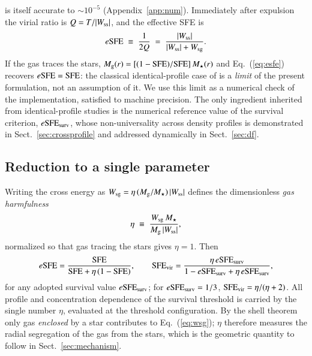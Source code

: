 \documentclass{aa}
\newcommand{\esfe}{e{\rm SFE}}
\newcommand{\sfe}{{\rm SFE}}
\begin{document}
is itself accurate to $\sim10^{-5}$ (Appendix~\ref{app:num}).
Immediately after expulsion the virial ratio is $Q=T/|W_{\rm ss}|$, and
the effective SFE \citep{Goodwin2009} is
\begin{equation}
  \esfe \;\equiv\; \frac{1}{2Q}
        \;=\; \frac{|W_{\rm ss}|}{|W_{\rm ss}|+W_{\rm sg}} .
  \label{eq:esfe}
\end{equation}
If the gas traces the stars, $M_{\rm g}(r)=[(1-\sfe)/\sfe]\,M_\star(r)$
and Eq.~(\ref{eq:esfe}) recovers $\esfe=\sfe$: the classical
identical-profile case of \citet{BoilyKroupa2003a} is a \emph{limit} of
the present formulation, not an assumption of it. We use this limit as a
numerical check of the implementation, satisfied to machine precision.
The only ingredient inherited from identical-profile studies is the
numerical reference value of the survival criterion,
$\esfe_{\rm surv}$, whose non-universality across density profiles is
demonstrated in Sect.~\ref{sec:crossprofile} and addressed dynamically in
Sect.~\ref{sec:df}.

\subsection{Reduction to a single parameter}
\label{sec:eta}

Writing the cross energy as
$W_{\rm sg}=\eta\,(M_{\rm g}/M_\star)\,|W_{\rm ss}|$ defines the
dimensionless \emph{gas harmfulness}
\begin{equation}
  \eta \;\equiv\; \frac{W_{\rm sg}\,M_\star}{M_{\rm g}\,|W_{\rm ss}|},
  \label{eq:eta}
\end{equation}
normalized so that gas tracing the stars gives $\eta=1$. Then
\begin{equation}
  \esfe = \frac{\sfe}{\sfe+\eta\,(1-\sfe)},
  \qquad
  \sfe_{\rm vir}=\frac{\eta\,\esfe_{\rm surv}}{1-\esfe_{\rm surv}+\eta\,\esfe_{\rm surv}},
  \label{eq:reduction}
\end{equation}
for any adopted survival value $\esfe_{\rm surv}$; for $\esfe_{\rm surv}=1/3$,
$\sfe_{\rm vir}=\eta/(\eta+2)$. All profile and concentration
dependence of the survival threshold is carried by the single number
$\eta$, evaluated at the threshold configuration. By the shell theorem
only gas \emph{enclosed} by a star contributes to Eq.~(\ref{eq:wsg});
$\eta$ therefore measures the radial segregation of the gas from the
stars, which is the geometric quantity to follow in
Sect.~\ref{sec:mechanism}.

\end{document}
